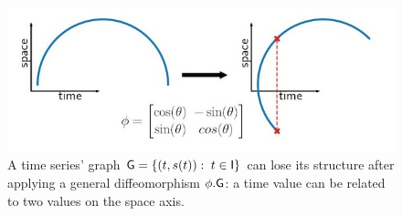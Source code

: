 
\begin{figure}[t]
  \centering
  \includegraphics[width=0.7\linewidth]{"./pictures/diffeo.jpeg"}
  
  \caption{A time series' graph $\mathsf{G}=\{(t,s(t)): \; t\in\mathsf{I}\} $ can lose its structure after applying a general diffeomorphism $\phi.\mathsf{G}$: a time value can be related to two values on the space axis.}
  \label{fig:diffeo}
  
\end{figure}

